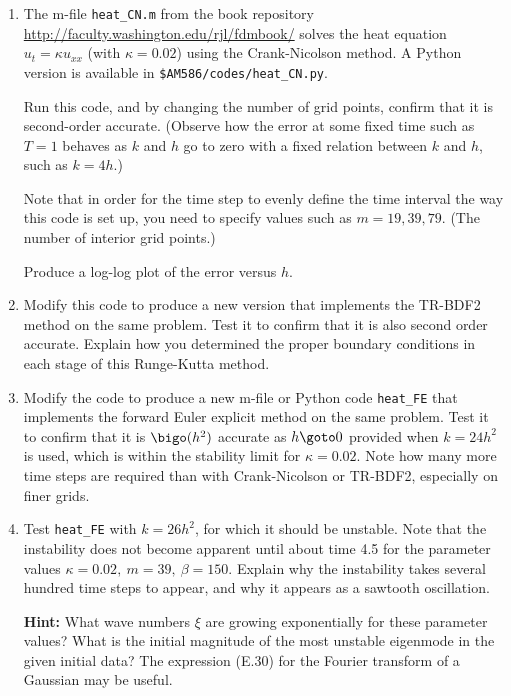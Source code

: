 \documentclass[10pt]{article}
\begin{document}
\begin{enumerate} 
\item The m-file \verb+heat_CN.m+ from the book repository
\url{http://faculty.washington.edu/rjl/fdmbook/} 
solves the heat equation $u_t = \kappa u_{xx}$  (with $\kappa = 0.02$)
using the Crank-Nicolson method.
A Python version is available in \verb+$AM586/codes/heat_CN.py+.

Run this code, and by changing the number of grid points, confirm that it is
second-order accurate.  (Observe how the error at some fixed time such as $T=1$
behaves as $k$ and $h$ go to zero with a fixed relation between $k$ and $h$,
such as $k = 4h$.)

Note that in order for the time step to evenly define the time interval the
way this code is set up, you need to specify values such as $m=19, 39, 79$.
(The number of interior grid points.)

Produce a log-log plot of the error versus $h$.

\item Modify this code to produce a new version that
implements the TR-BDF2 method on the same problem.  Test it to confirm that
it is also second order accurate.  Explain how you determined the proper
boundary conditions in each stage of this Runge-Kutta method.

\item Modify the code to produce a new m-file or Python code \verb+heat_FE+ that
implements the forward Euler explicit 
method on the same problem.  Test it to confirm that
it is $\bigo(h^2)$ accurate as $h\goto 0$ provided when $k = 24 h^2$ is
used, which is within the stability limit for $\kappa = 0.02$.  Note how
many more time steps are required than with Crank-Nicolson or TR-BDF2,
especially on finer grids.

\item Test \verb+heat_FE+ with $k = 26 h^2$, for which it should be
unstable.  Note that the instability does not become apparent until about
time 4.5 for the parameter values $\kappa = 0.02,~ m=39,~\beta = 150$.
Explain why the instability takes several hundred time steps to appear, and
why it appears as a sawtooth oscillation. 

{\bf Hint:} What wave numbers $\xi$ are growing exponentially for these
parameter values?  What is the initial magnitude of the most unstable
eigenmode in the given initial data?  The expression (E.30) for the Fourier
transform of a Gaussian may be useful.

\end{enumerate}
\end{document}
